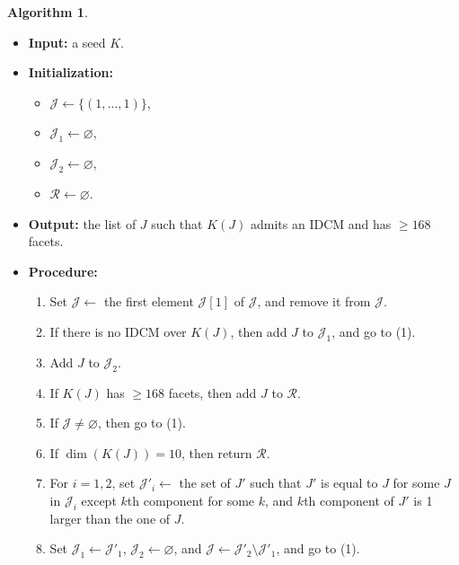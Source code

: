 \documentclass[11pt]{amsart}
\theoremstyle{plain}
\numberwithin{equation}{section}
\theoremstyle{definition}
\newtheorem{algorithm}[theorem]{Algorithm}
\newcommand{\cJ}{\mathcal{J}}
\newcommand{\cR}{\mathcal{R}}
\begin{document}
\begin{algorithm}~\\ \label{algorithm:168}
      \begin{itemize}
      \item \textbf{Input:} a seed $K$.
      \item \textbf{Initialization:} \begin{itemize}
                                       \item[] $\cJ \leftarrow \{(1, \dots, 1)\}$,
                                       \item[] $\cJ_1 \leftarrow \varnothing$,
                                       \item[] $\cJ_2 \leftarrow \varnothing$,
                                       \item[] $\cR \leftarrow \varnothing$.
                                     \end{itemize} 
      \item \textbf{Output:} the list of $J$ such that $K(J)$ admits an IDCM and has $\geq 168$ facets.
      \item \textbf{Procedure:} \begin{enumerate}
                                  \item Set $\cJ \leftarrow$ the first element $\cJ[1]$ of $\cJ$, and remove it from $\cJ$.
                                  \item If there is no IDCM over $K(J)$, then add $J$ to $\cJ_1$, and go to (1).
                                  \item Add $J$ to $\cJ_2$.
                                  \item If $K(J)$ has  $\geq 168$ facets, then add $J$ to $\cR$.
                                  \item If $\cJ \not= \varnothing$, then go to (1).
                                  \item If $\dim(K(J)) = 10$, then return $\cR$.
                                  \item For $i=1, 2$, set $\cJ'_i \leftarrow$ the set of $J'$ such that $J'$ is equal to $J$ for some $J$ in $\cJ_i$ except $k$th component for some $k$, and $k$th component of $J'$ is 1 larger than the one of $J$.
                                  \item Set $\cJ_1 \leftarrow \cJ'_1$, $\cJ_2 \leftarrow \varnothing$, and $\cJ \leftarrow \cJ'_2 \setminus \cJ'_1$, and go to (1).
                                \end{enumerate}
    \end{itemize}
\end{algorithm}
\end{document}
